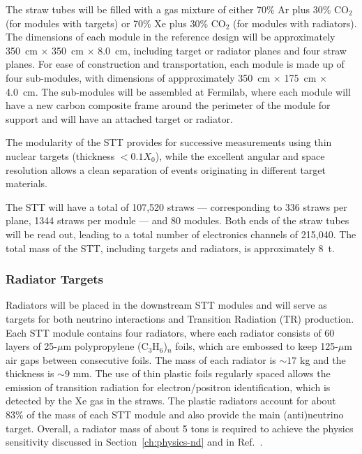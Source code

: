 The straw tubes will be filled with a
gas mixture of either 70\% Ar plus 30\% CO$_2$ (for modules with targets) or
70\% Xe plus 30\% CO$_2$ (for modules with radiators). 
The dimensions of each module in the reference design will
be approximately 350~cm $\times$ 350~cm $\times$ 8.0~cm, including 
target or radiator planes and four straw planes. For ease of construction and
transportation, each module is made up of four sub-modules, with dimensions of
appproximately 350~cm $\times$ 175~cm $\times$ 4.0~cm. 
The sub-modules will be assembled %
at Fermilab, where each module will have a new carbon composite frame around 
the perimeter of the module for support and will have an attached target or 
radiator. 

The modularity of the STT provides for successive measurements using
thin nuclear targets (thickness $< 0.1 X_0$), while the excellent
angular and space resolution allows a clean separation of events
originating in different target materials.

The STT will have a total of 107,520 straws  --- corresponding to 336 straws per plane,
1344 straws per module ---
and 80 modules. Both ends of the straw tubes will be read out, leading to a total
number of electronics channels of 215,040. The total mass of the STT, including targets and radiators, is approximately 8~t.  

\subsubsection{Radiator Targets} 


Radiators will be placed in the downstream STT modules
and will serve as targets for both neutrino interactions 
and Transition Radiation (TR) production. Each STT module contains 
four radiators, where each radiator consists of
60 layers of 25-$\mu$m polypropylene (C$_3$H$_6$)$_n$ 
foils, which are embossed to keep 125-$\mu$m air gaps between 
consecutive foils. 
The mass of each radiator is $\sim17$ kg and the thickness is 
$\sim9$ mm. The use of thin plastic foils regularly spaced allows 
the emission of transition radiation for electron/positron identification, 
which is detected by the Xe gas in the straws. 
% 
The plastic radiators account for about 83\% of the mass of each STT module and 
also provide the main (anti)neutrino target. Overall, a radiator mass of about 5 tons 
is required to achieve the physics sensitivity discussed in Section~\ref{ch:physics-nd} 
and in Ref.~\cite{DPR}. 

